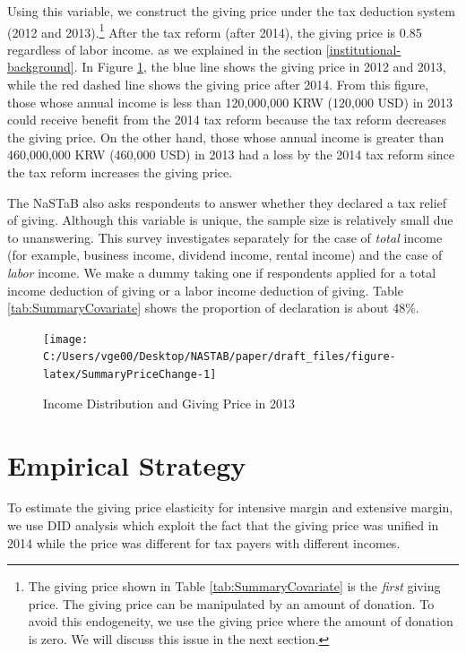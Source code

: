 \documentclass[
  11pt,
  a4paper,
]{article}
\begin{document}
Using this variable, we construct the giving price under the tax deduction system (2012 and 2013).\footnote{The giving price shown in Table \ref{tab:SummaryCovariate} is the \emph{first} giving price. The giving price can be manipulated by an amount of donation. To avoid this endogeneity, we use the giving price where the amount of donation is zero. We will discuss this issue in the next section.}
After the tax reform (after 2014), the giving price is 0.85 regardless of labor income.
as we explained in the section \ref{institutional-background}.
In Figure \ref{fig:SummaryPriceChange},
the blue line shows the giving price in 2012 and 2013,
while the red dashed line shows the giving price after 2014.
From this figure,
those whose annual income is less than 120,000,000 KRW (120,000 USD) in 2013 could receive benefit from the 2014 tax reform
because the tax reform decreases the giving price.
On the other hand,
those whose annual income is greater than 460,000,000 KRW (460,000 USD) in 2013 had a loss by the 2014 tax reform
since the tax reform increases the giving price.

The NaSTaB also asks respondents to answer whether they declared a tax relief of giving.
Although this variable is unique, the sample size is relatively small due to unanswering.
This survey investigates separately for the case of \emph{total} income (for example, business income, dividend income, rental income)
and the case of \emph{labor} income.
We make a dummy taking one if respondents applied for a total income deduction of giving
or a labor income deduction of giving.
Table \ref{tab:SummaryCovariate} shows the proportion of declaration is about 48\%.

\begin{figure}[t]

{\centering \texttt{[image: C:/Users/vge00/Desktop/NASTAB/paper/draft\_files/figure-latex/SummaryPriceChange-1]} 

}

\caption{Income Distribution and Giving Price in 2013}\label{fig:SummaryPriceChange}
\end{figure}

\hypertarget{empirical-strategy}{%
\section{Empirical Strategy}\label{empirical-strategy}}

To estimate the giving price elasticity for intensive margin and extensive margin, we use DID analysis which exploit the fact that the giving price was unified in 2014 while the price was different for tax payers with different incomes.
\end{document}

